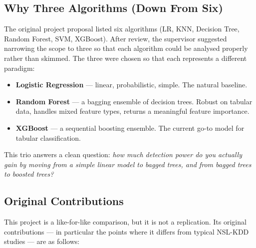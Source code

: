 \documentclass[11pt, a4paper]{article}
\begin{document}
\subsection{Why Three Algorithms (Down From Six)}
The original project proposal listed six algorithms (LR, KNN, Decision Tree, Random Forest, SVM, XGBoost). After review, the supervisor suggested narrowing the scope to three so that each algorithm could be analysed properly rather than skimmed. The three were chosen so that each represents a different paradigm:

\begin{itemize}
    \item \textbf{Logistic Regression} --- linear, probabilistic, simple. The natural baseline.
    \item \textbf{Random Forest} --- a bagging ensemble of decision trees. Robust on tabular data, handles mixed feature types, returns a meaningful feature importance.
    \item \textbf{XGBoost} --- a sequential boosting ensemble. The current go-to model for tabular classification.
\end{itemize}

This trio answers a clean question: \emph{how much detection power do you actually gain by moving from a simple linear model to bagged trees, and from bagged trees to boosted trees?}

\subsection{Original Contributions}
\label{sec:contributions}
This project is a like-for-like comparison, but it is not a replication. Its original contributions --- in particular the points where it differs from typical NSL-KDD studies --- are as follows:
\end{document}
